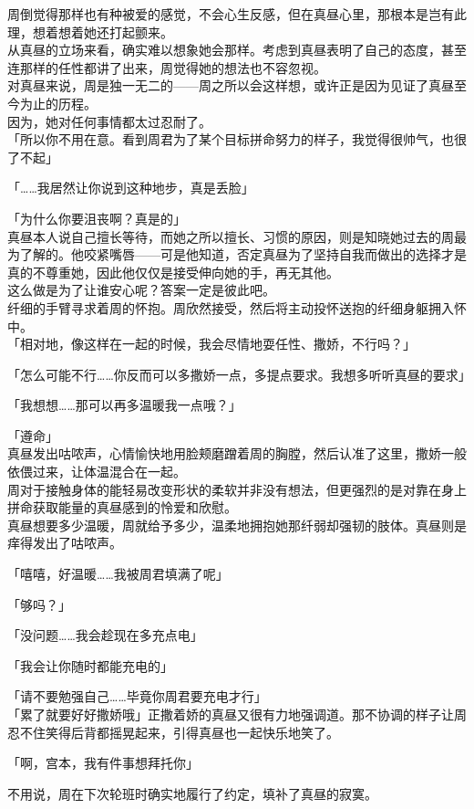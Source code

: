 周倒觉得那样也有种被爱的感觉，不会心生反感，但在真昼心里，那根本是岂有此理，想着想着她还打起颤来。\\

从真昼的立场来看，确实难以想象她会那样。考虑到真昼表明了自己的态度，甚至连那样的任性都讲了出来，周觉得她的想法也不容忽视。\\

对真昼来说，周是独一无二的——周之所以会这样想，或许正是因为见证了真昼至今为止的历程。\\

因为，她对任何事情都太过忍耐了。\\

「所以你不用在意。看到周君为了某个目标拼命努力的样子，我觉得很帅气，也很了不起」

「……我居然让你说到这种地步，真是丢脸」

「为什么你要沮丧啊？真是的」\\

真昼本人说自己擅长等待，而她之所以擅长、习惯的原因，则是知晓她过去的周最为了解的。他咬紧嘴唇——可是他知道，否定真昼为了坚持自我而做出的选择才是真的不尊重她，因此他仅仅是接受伸向她的手，再无其他。\\

这么做是为了让谁安心呢？答案一定是彼此吧。\\

纤细的手臂寻求着周的怀抱。周欣然接受，然后将主动投怀送抱的纤细身躯拥入怀中。\\

「相对地，像这样在一起的时候，我会尽情地耍任性、撒娇，不行吗？」

「怎么可能不行……你反而可以多撒娇一点，多提点要求。我想多听听真昼的要求」

「我想想……那可以再多温暖我一点哦？」

「遵命」\\

真昼发出咕哝声，心情愉快地用脸颊磨蹭着周的胸膛，然后认准了这里，撒娇一般依偎过来，让体温混合在一起。\\

周对于接触身体的能轻易改变形状的柔软并非没有想法，但更强烈的是对靠在身上拼命获取能量的真昼感到的怜爱和欣慰。\\

真昼想要多少温暖，周就给予多少，温柔地拥抱她那纤弱却强韧的肢体。真昼则是痒得发出了咕哝声。

「嘻嘻，好温暖……我被周君填满了呢」

「够吗？」

「没问题……我会趁现在多充点电」

「我会让你随时都能充电的」

「请不要勉强自己……毕竟你周君要充电才行」\\

「累了就要好好撒娇哦」正撒着娇的真昼又很有力地强调道。那不协调的样子让周忍不住笑得后背都摇晃起来，引得真昼也一起快乐地笑了。\\

\vspace{2\baselineskip}

「啊，宫本，我有件事想拜托你」

不用说，周在下次轮班时确实地履行了约定，填补了真昼的寂寞。

